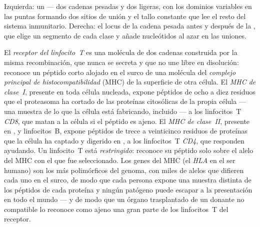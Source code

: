 \begin{omfigure}
{\small Izquierda: un  --- dos cadenas pesadas y dos ligeras,
con los dominios variables en las puntas formando dos sitios de unión y
el tallo constante que lee el resto del sistema inmunitario. Derecha: el
locus de la cadena pesada antes y después de la , que
elige un segmento de cada clase y añade nucleótidos al azar en las
uniones.}
\end{omfigure}

\begin{definition}\label{def:b3:adaptive-immunity:mhc}
El \emph{receptor del linfocito~T} es una molécula de dos cadenas
construida por la misma recombinación, que nunca se secreta y que no une
 libre en disolución: reconoce un péptido corto alojado en el
surco de una molécula del \emph{complejo principal de
histocompatibilidad} (MHC) de la superficie de otra célula. El \emph{MHC
de clase~I}, presente en toda célula nucleada, expone péptidos de ocho a
diez residuos que el proteasoma ha cortado de las proteínas citosólicas
de la propia célula --- una muestra de lo que la célula está fabricando,
 incluido --- a los linfocitos~T \emph{CD8}, que matan a la célula
si el péptido es ajeno. El \emph{MHC de clase~II}, presente en ,  y linfocitos~B, expone péptidos de trece a
veinticinco residuos de proteínas que la célula ha captado y digerido en
, a los linfocitos~T \emph{CD4}, que responden ayudando. Un
linfocito~T está \emph{restringido}: reconoce su péptido solo sobre el
alelo del MHC con el que fue seleccionado. Los genes del MHC (el
\emph{HLA} en el ser humano) son los más polimórficos del genoma, con
miles de alelos que difieren cada uno en el surco, de modo que cada
persona expone una muestra distinta de los péptidos de cada proteína y
ningún patógeno puede escapar a la presentación en todo el mundo --- y de
modo que un órgano trasplantado de un donante no compatible lo reconoce
como ajeno una gran parte de los linfocitos~T del receptor.
\end{definition}

